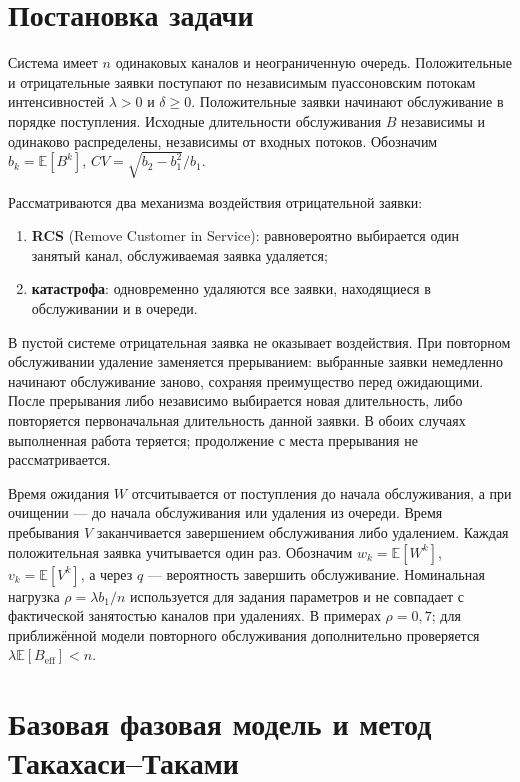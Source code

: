 \documentclass[a4paper,12pt]{article}
\begin{document}
\section{Постановка задачи}
Система имеет \(n\) одинаковых каналов и неограниченную очередь. Положительные и отрицательные заявки поступают по независимым пуассоновским потокам интенсивностей \(\lambda>0\) и \(\delta\ge0.\) Положительные заявки начинают обслуживание в порядке поступления. Исходные длительности обслуживания \(B\) независимы и одинаково распределены, независимы от входных потоков. Обозначим \(b_k=\mathbb E[B^k]\), \(CV=\sqrt{b_2-b_1^2}/b_1.\)

Рассматриваются два механизма воздействия отрицательной заявки:
\begin{enumerate}[leftmargin=1.5em]
\item \textbf{RCS} (Remove Customer in Service): равновероятно выбирается один занятый канал, обслуживаемая заявка удаляется;
\item \textbf{катастрофа}: одновременно удаляются все заявки, находящиеся в обслуживании и в очереди.
\end{enumerate}
В пустой системе отрицательная заявка не оказывает воздействия. При повторном обслуживании удаление заменяется прерыванием: выбранные заявки немедленно начинают обслуживание заново, сохраняя преимущество перед ожидающими. После прерывания либо независимо выбирается новая длительность, либо повторяется первоначальная длительность данной заявки. В обоих случаях выполненная работа теряется; продолжение с места прерывания не рассматривается.

Время ожидания \(W\) отсчитывается от поступления до начала обслуживания, а при очищении --- до начала обслуживания или удаления из очереди. Время пребывания \(V\) заканчивается завершением обслуживания либо удалением. Каждая положительная заявка учитывается один раз. Обозначим \(w_k=\mathbb E[W^k]\), \(v_k=\mathbb E[V^k]\), а через \(q\) --- вероятность завершить обслуживание. Номинальная нагрузка \(\rho=\lambda b_1/n\) используется для задания параметров и не совпадает с фактической занятостью каналов при удалениях. В примерах \(\rho=0{,}7\); для приближённой модели повторного обслуживания дополнительно проверяется \(\lambda\mathbb E[B_{\mathrm{eff}}]<n.\)

\section{Базовая фазовая модель и метод Такахаси--Таками}
\end{document}
